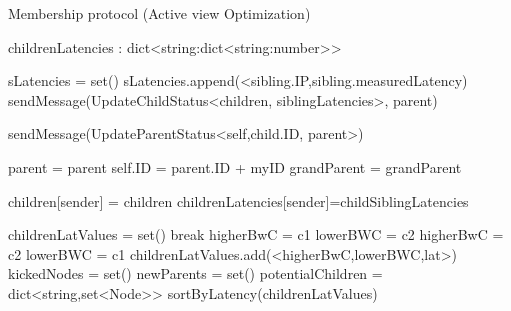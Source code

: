 \begin{algorithm}
    \begin{algorithmic}[1]

        \caption{Membership protocol (Active view Optimization)}

        \asdstate
        \State childrenLatencies : dict<string:dict<string:number>>
        \asdend

        \State sLatencies = set()
        \State sLatencies.append(<sibling.IP,sibling.measuredLatency)
        \EndFor
        \State sendMessage(UpdateChildStatus<children, siblingLatencies>, parent)
        \EndIf
        \asdend

        \State sendMessage(UpdateParentStatus<self,child.ID, parent>)
        \EndFor
        \asdend

        \State parent = parent
        \State self.ID = parent.ID + myID
        \State grandParent = grandParent
        \EndIf
        \asdend

        \State children[sender] = children
        \State childrenLatencies[sender]=childSiblingLatencies
        \EndIf
        \asdend

        \State childrenLatValues = set()
        \State break
        \EndIf
        \State higherBwC = c1
        \State lowerBWC = c2
        \State higherBwC = c2
        \State lowerBWC = c1
        \EndIf
        \State childrenLatValues.add(<higherBwC,lowerBWC,lat>)
        \EndFor
        \EndFor
        \State kickedNodes = set()
        \State newParents = set()
        \State potentialChildren = dict<string,set<Node>>
        \State sortByLatency(childrenLatValues)


\end{algorithmic}
\end{algorithm}
